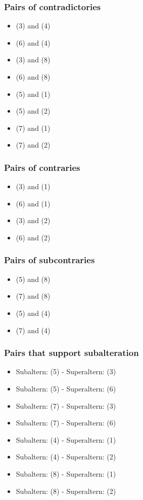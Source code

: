 \subsubsection{Pairs of contradictories}
\begin{itemize}
    \item (3) and (4)
    \item (6) and (4)
    \item (3) and (8)
    \item (6) and (8)
    \item (5) and (1)
    \item (5) and (2)
    \item (7) and (1)
    \item (7) and (2)
\end{itemize}


\subsubsection{Pairs of contraries}
\begin{itemize}
    \item (3) and (1)
    \item (6) and (1)
    \item (3) and (2)
    \item (6) and (2)
\end{itemize}

\subsubsection{Pairs of subcontraries}
\begin{itemize}
    \item (5) and (8)
    \item (7) and (8)
    \item (5) and (4)
    \item (7) and (4)
\end{itemize}

\subsubsection{Pairs that support subalteration}
\begin{itemize}
    \item Subaltern: (5) - Superaltern: (3)
    \item Subaltern: (5) - Superaltern: (6)
    \item Subaltern: (7) - Superaltern: (3)
    \item Subaltern: (7) - Superaltern: (6)
    \item Subaltern: (4) - Superaltern: (1)
    \item Subaltern: (4) - Superaltern: (2)
    \item Subaltern: (8) - Superaltern: (1)
    \item Subaltern: (8) - Superaltern: (2)
\end{itemize}

